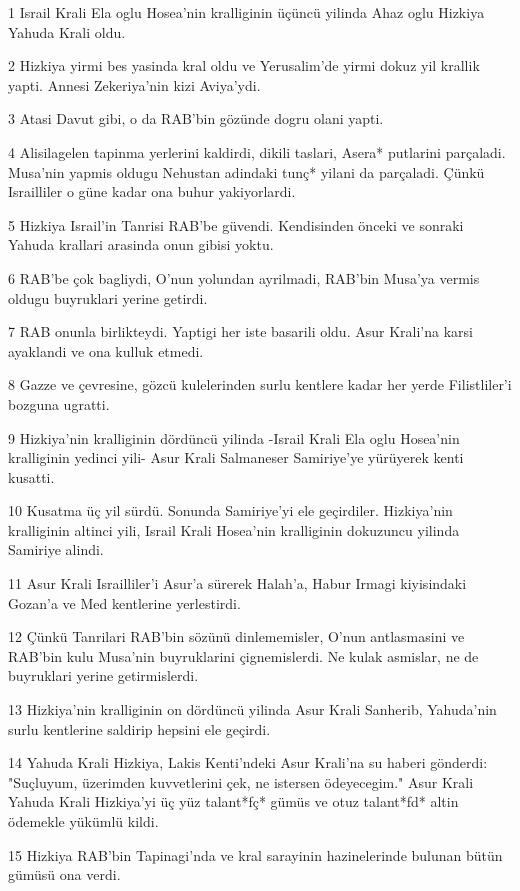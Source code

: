 \par 1 Israil Krali Ela oglu Hosea'nin kralliginin üçüncü yilinda Ahaz oglu Hizkiya Yahuda Krali oldu.
\par 2 Hizkiya yirmi bes yasinda kral oldu ve Yerusalim'de yirmi dokuz yil krallik yapti. Annesi Zekeriya'nin kizi Aviya'ydi.
\par 3 Atasi Davut gibi, o da RAB'bin gözünde dogru olani yapti.
\par 4 Alisilagelen tapinma yerlerini kaldirdi, dikili taslari, Asera* putlarini parçaladi. Musa'nin yapmis oldugu Nehustan adindaki tunç* yilani da parçaladi. Çünkü Israilliler o güne kadar ona buhur yakiyorlardi.
\par 5 Hizkiya Israil'in Tanrisi RAB'be güvendi. Kendisinden önceki ve sonraki Yahuda krallari arasinda onun gibisi yoktu.
\par 6 RAB'be çok bagliydi, O'nun yolundan ayrilmadi, RAB'bin Musa'ya vermis oldugu buyruklari yerine getirdi.
\par 7 RAB onunla birlikteydi. Yaptigi her iste basarili oldu. Asur Krali'na karsi ayaklandi ve ona kulluk etmedi.
\par 8 Gazze ve çevresine, gözcü kulelerinden surlu kentlere kadar her yerde Filistliler'i bozguna ugratti.
\par 9 Hizkiya'nin kralliginin dördüncü yilinda -Israil Krali Ela oglu Hosea'nin kralliginin yedinci yili- Asur Krali Salmaneser Samiriye'ye yürüyerek kenti kusatti.
\par 10 Kusatma üç yil sürdü. Sonunda Samiriye'yi ele geçirdiler. Hizkiya'nin kralliginin altinci yili, Israil Krali Hosea'nin kralliginin dokuzuncu yilinda Samiriye alindi.
\par 11 Asur Krali Israilliler'i Asur'a sürerek Halah'a, Habur Irmagi kiyisindaki Gozan'a ve Med kentlerine yerlestirdi.
\par 12 Çünkü Tanrilari RAB'bin sözünü dinlememisler, O'nun antlasmasini ve RAB'bin kulu Musa'nin buyruklarini çignemislerdi. Ne kulak asmislar, ne de buyruklari yerine getirmislerdi.
\par 13 Hizkiya'nin kralliginin on dördüncü yilinda Asur Krali Sanherib, Yahuda'nin surlu kentlerine saldirip hepsini ele geçirdi.
\par 14 Yahuda Krali Hizkiya, Lakis Kenti'ndeki Asur Krali'na su haberi gönderdi: "Suçluyum, üzerimden kuvvetlerini çek, ne istersen ödeyecegim." Asur Krali Yahuda Krali Hizkiya'yi üç yüz talant*fç* gümüs ve otuz talant*fd* altin ödemekle yükümlü kildi.
\par 15 Hizkiya RAB'bin Tapinagi'nda ve kral sarayinin hazinelerinde bulunan bütün gümüsü ona verdi.
